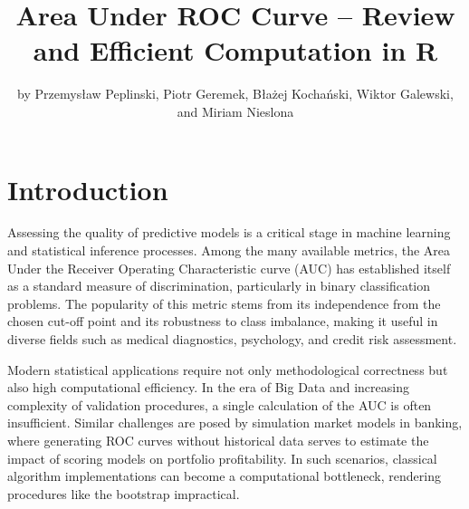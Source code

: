 \title{Area Under ROC Curve -- Review and Efficient Computation in R}


\author{by Przemysław Peplinski, Piotr Geremek, Błażej Kochański, Wiktor Galewski, and Miriam Nieslona}

\maketitle


\section{Introduction}\label{introduction}

Assessing the quality of predictive models is a critical stage in
machine learning and statistical inference processes. Among the many
available metrics, the Area Under the Receiver Operating Characteristic
curve (AUC) has established itself as a standard measure of
discrimination, particularly in binary classification problems. The
popularity of this metric stems from its independence from the chosen
cut-off point and its robustness to class imbalance, making it useful in
diverse fields such as medical diagnostics, psychology, and credit risk
assessment.

Modern statistical applications require not only methodological
correctness but also high computational efficiency. In the era of Big
Data and increasing complexity of validation procedures, a single
calculation of the AUC is often insufficient. Similar challenges are
posed by simulation market models in banking, where generating ROC
curves without historical data serves to estimate the impact of scoring
models on portfolio profitability. In such scenarios, classical
algorithm implementations can become a computational bottleneck,
rendering procedures like the bootstrap impractical.

